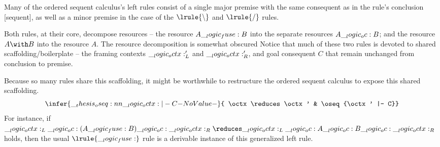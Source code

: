Many of the ordered sequent calculus's left rules consist of a single major premise with the same consequent as in the rule's conclusion [sequent], as well as a minor premise in the case of the $\lrule{\limp}$ and $\lrule{\pmir}$ rules.
Both rules, at their core, decompose resources -- the resource $A \__logic_fuse: B$ into the separate resources $A \__logic_oc: B$; and the resource $A \with B$ into the resource $A$.
The resource decomposition is somewhat obscured 
Notice that much of these two rules is devoted to shared scaffolding/boilerplate -- the framing contexts $\__logic_octx:'_L$ and $\__logic_octx:'_R$, and goal consequent $C$ that remain unchanged from conclusion to premise.

Because so many rules share this scaffolding, it might be worthwhile to restructure the ordered sequent calculus to expose this shared scaffolding.
\begin{equation*}
  \infer{\oseq{\octx |- C}}{
    \octx \reduces \octx' & \oseq{\octx' |- C}}
\end{equation*}
For instance, if $\octx_L \oc (A \fuse B) \oc \octx_R \reduces \octx_L \oc A \oc B \oc \octx_R$ holds, then the usual $\lrule{\fuse}$ rule is a derivable instance of this generalized left rule.


